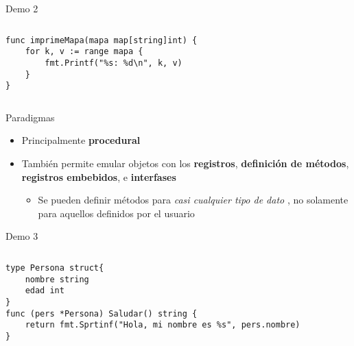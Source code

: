 \begin{frame}[fragile]{Demo 2}

{
    \renewcommand{\baselinestretch}{1} 

    \begin{columns}
        \begin{lstlisting}[title={Iterando sobre un mapa}]
func imprimeMapa(mapa map[string]int) {
    for k, v := range mapa {
        fmt.Printf("%s: %d\n", k, v)
    }
}
        \end{lstlisting}
    \end{columns}
}
\end{frame}

\begin{frame}{Paradigmas}

    \begin{itemize}
        \item Principalmente \textbf{procedural} 
        \item También permite emular objetos con los \textbf{registros}, \textbf{definición de métodos}, \textbf{registros embebidos}, e \textbf{interfases}   
        \begin{itemize}
            \item Se pueden definir métodos para \emph{casi cualquier tipo de dato} \autocite{TheWayToGo:Methods}, no solamente para aquellos definidos por el usuario 
        \end{itemize}
    \end{itemize}
    
\end{frame}

\begin{frame}[fragile]{Demo 3}

{
    \renewcommand{\baselinestretch}{1} 

    \begin{columns}
        \begin{lstlisting}[title={Definición de un registro y un método}]
type Persona struct{
    nombre string
    edad int
}
func (pers *Persona) Saludar() string {
    return fmt.Sprtinf("Hola, mi nombre es %s", pers.nombre)
}
        \end{lstlisting}
    \end{columns}
}

\end{frame}

